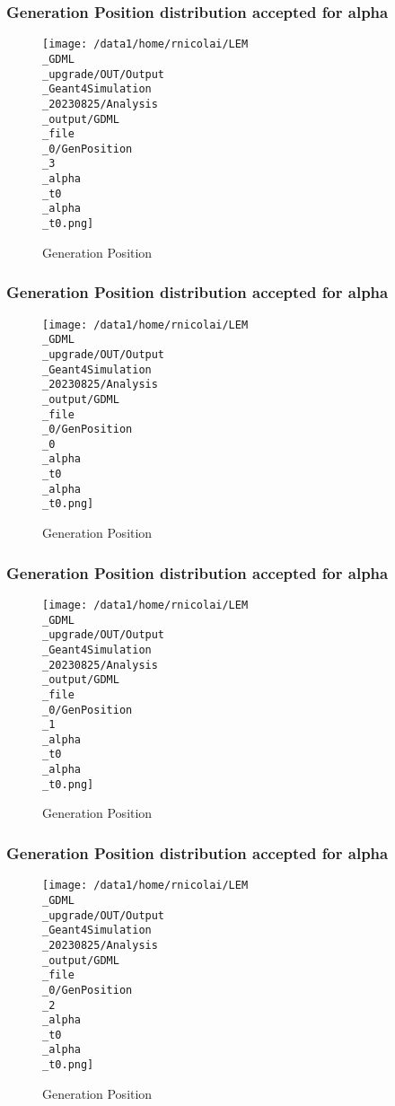 \documentclass[8pt]{beamer}
\begin{document}
            \begin{frame}
                \frametitle{Generation Position distribution accepted for alpha}
            
        \begin{figure}[h]
            \centering
            \texttt{[image: /data1/home/rnicolai/LEM\\\_GDML\\\_upgrade/OUT/Output\\\_Geant4Simulation\\\_20230825/Analysis\\\_output/GDML\\\_file\\\_0/GenPosition\\\_3\\\_alpha\\\_t0\\\_alpha\\\_t0.png]}
            \caption{Generation Position}
        \end{figure}
        
            \end{frame}
            
            \begin{frame}
                \frametitle{Generation Position distribution accepted for alpha}
            
        \begin{figure}[h]
            \centering
            \texttt{[image: /data1/home/rnicolai/LEM\\\_GDML\\\_upgrade/OUT/Output\\\_Geant4Simulation\\\_20230825/Analysis\\\_output/GDML\\\_file\\\_0/GenPosition\\\_0\\\_alpha\\\_t0\\\_alpha\\\_t0.png]}
            \caption{Generation Position}
        \end{figure}
        
            \end{frame}
            
            \begin{frame}
                \frametitle{Generation Position distribution accepted for alpha}
            
        \begin{figure}[h]
            \centering
            \texttt{[image: /data1/home/rnicolai/LEM\\\_GDML\\\_upgrade/OUT/Output\\\_Geant4Simulation\\\_20230825/Analysis\\\_output/GDML\\\_file\\\_0/GenPosition\\\_1\\\_alpha\\\_t0\\\_alpha\\\_t0.png]}
            \caption{Generation Position}
        \end{figure}
        
            \end{frame}
            
            \begin{frame}
                \frametitle{Generation Position distribution accepted for alpha}
            
        \begin{figure}[h]
            \centering
            \texttt{[image: /data1/home/rnicolai/LEM\\\_GDML\\\_upgrade/OUT/Output\\\_Geant4Simulation\\\_20230825/Analysis\\\_output/GDML\\\_file\\\_0/GenPosition\\\_2\\\_alpha\\\_t0\\\_alpha\\\_t0.png]}
            \caption{Generation Position}
        \end{figure}
        
            \end{frame}
            
\end{document}

